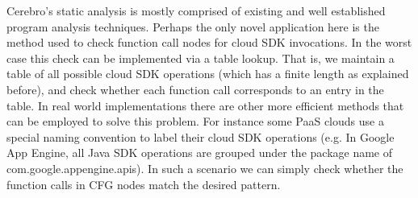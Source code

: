  Cerebro's static analysis is mostly comprised of existing and well established program analysis techniques.
 Perhaps the only novel application here is the method used to check function call nodes for cloud SDK invocations.
 In the worst case this check can be implemented via a table lookup. That is, we maintain a table of all possible cloud
 SDK operations (which has a finite length as explained before), and check whether each function call
 corresponds to an entry in the table. In real world implementations there are other more efficient methods that
 can be employed to solve this problem. For instance some PaaS clouds use a special naming convention to label
 their cloud SDK operations (e.g. In Google App Engine, all Java SDK operations are grouped under the package name of
 com.google.appengine.apis). In such a scenario we can simply check whether the function calls in CFG nodes match the
 desired pattern. 